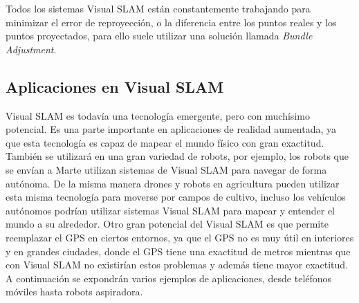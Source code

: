 Todos los sistemas Visual SLAM están constantemente trabajando para minimizar el error de reproyección, o la diferencia entre los puntos reales y los puntos proyectados, para ello suele utilizar una solución llamada \textit{Bundle Adjustment}.




\subsection{Aplicaciones en Visual SLAM} 

Visual SLAM es todavía una tecnología emergente, pero con muchísimo potencial. Es una parte importante en aplicaciones de realidad aumentada, ya que esta tecnología es capaz de mapear el mundo físico con gran exactitud. También se utilizará en una gran variedad de robots, por ejemplo, los robots que se envían a Marte utilizan sistemas de Visual SLAM para navegar de forma autónoma. De la misma manera drones y robots en agricultura pueden utilizar esta misma tecnología para moverse por campos de cultivo, incluso los vehículos autónomos podrían utilizar sistemas Visual SLAM para mapear y entender el mundo a su alrededor. Otro gran potencial del Visual SLAM es que permite reemplazar el GPS en ciertos entornos, ya que el GPS no es muy útil en interiores y en grandes ciudades, donde el GPS tiene una exactitud de metros mientras que con Visual SLAM no existirían estos problemas y además tiene mayor exactitud.
A continuación se expondrán varios ejemplos de aplicaciones, desde teléfonos móviles hasta robots aspiradora.
